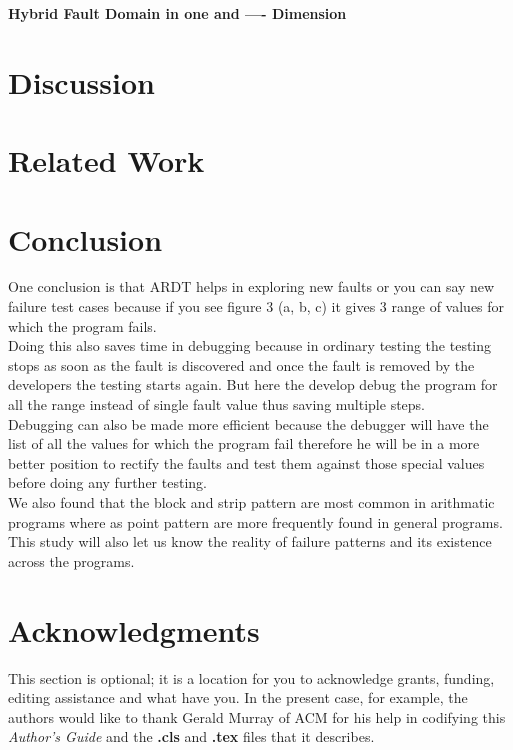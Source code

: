 \documentclass{acm_proc_article-sp}
\begin{document}
\textbf{ Hybrid Fault Domain in one and ---- Dimension }



\section{Discussion} \label{sec:discussion}

\section{Related Work} \label{sec:relatedWork}



\section{Conclusion} \label{sec:conclusion}
One conclusion is that ARDT helps in exploring new faults or you can say new failure test cases because if you see figure 3 (a, b, c) it gives 3 range of values for which the program fails. \\

Doing this also saves time in debugging because in ordinary testing the testing stops as soon as the fault is discovered and once the fault is removed by the developers the testing starts again. But here the develop debug the program for all the range instead of single fault value thus saving multiple steps. \\


Debugging can also be made more efficient because the debugger will have the list of all the values for which the program fail therefore he will be in a more better position to rectify the faults and test them against those special values before doing any further testing.\\

We also found that the block and strip pattern are most common in arithmatic programs where as point pattern are more frequently found in general programs. \\

This study will also let us know the reality of failure patterns and its existence across the programs.


\section{Acknowledgments} \label{sec:acknowledgments}
This section is optional; it is a location for you
to acknowledge grants, funding, editing assistance and
what have you.  In the present case, for example, the
authors would like to thank Gerald Murray of ACM for
his help in codifying this \textit{Author's Guide}
and the \textbf{.cls} and \textbf{.tex} files that it describes.
\end{document}
